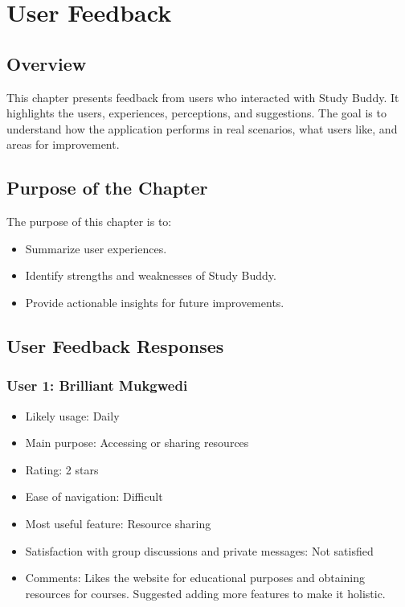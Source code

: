 \chapter{User Feedback}

\section{Overview}
This chapter presents feedback from users who interacted with Study Buddy.  
It highlights the users, experiences, perceptions, and suggestions.  
The goal is to understand how the application performs in real scenarios, what users like, and areas for improvement.

\section{Purpose of the Chapter}
The purpose of this chapter is to:
\begin{itemize}
    \item Summarize user experiences.
    \item Identify strengths and weaknesses of Study Buddy.
    \item Provide actionable insights for future improvements.
\end{itemize}

\section{User Feedback Responses}

\subsection*{User 1: Brilliant Mukgwedi}
\begin{itemize}
    \item Likely usage: Daily
    \item Main purpose: Accessing or sharing resources
    \item Rating: 2 stars
    \item Ease of navigation: Difficult
    \item Most useful feature: Resource sharing
    \item Satisfaction with group discussions and private messages: Not satisfied
    \item Comments: Likes the website for educational purposes and obtaining resources for courses. Suggested adding more features to make it holistic.
\end{itemize}


